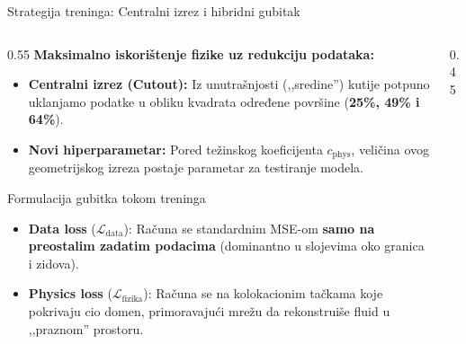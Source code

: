 \documentclass[10pt,aspectratio=169]{beamer}
\begin{document}
\begin{frame}{Strategija treninga: Centralni izrez i hibridni gubitak}
  \begin{columns}[T]
    \begin{column}{0.55\textwidth}
      \small
      \textbf{Maksimalno iskorištenje fizike uz redukciju podataka:}
      \begin{itemize}
        \item \textbf{Centralni izrez (Cutout):} Iz unutrašnjosti (,,sredine'') kutije potpuno uklanjamo podatke u obliku kvadrata određene površine (\textbf{25\%, 49\% i 64\%}).
        \item \textbf{Novi hiperparametar:} Pored težinskog koeficijenta $c_{\text{phys}}$, veličina ovog geometrijskog izreza postaje parametar za testiranje modela.
      \end{itemize}
      \medskip
      \begin{block}{Formulacija gubitka tokom treninga}
        \begin{itemize}
          \item \textbf{Data loss} ($\mathcal{L}_{\text{data}}$): Računa se standardnim MSE-om \textbf{samo na preostalim zadatim podacima} (dominantno u slojevima oko granica i zidova).
          \item \textbf{Physics loss} ($\mathcal{L}_{\text{fizika}}$): Računa se na kolokacionim tačkama koje pokrivaju cio domen, primoravajući mrežu da rekonstruiše fluid u ,,praznom'' prostoru.
        \end{itemize}
      \end{block}
    \end{column}
    
    \begin{column}{0.45\textwidth}
      \centering
\end{column}
\end{columns}
\end{frame}
\end{document}

